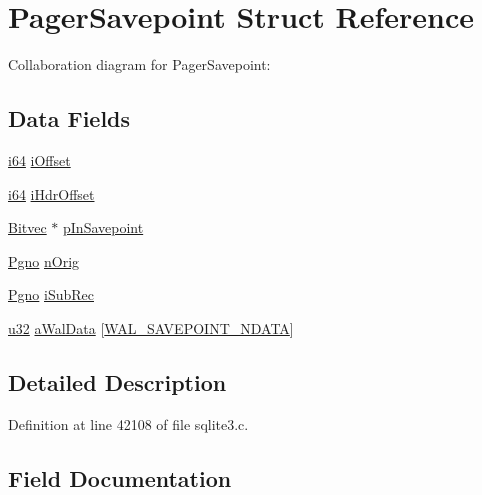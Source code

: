 \hypertarget{struct_pager_savepoint}{}\section{Pager\+Savepoint Struct Reference}
\label{struct_pager_savepoint}


Collaboration diagram for Pager\+Savepoint\+:
\subsection*{Data Fields}
\begin{DoxyCompactItemize}
\item 
\hyperlink{sqlite3_8c_a2a0f0f4ae7001eb54351f77ea1cdbcfd}{i64} \hyperlink{struct_pager_savepoint_a5847134335c04ff468319a20ca90c194}{i\+Offset}
\item 
\hyperlink{sqlite3_8c_a2a0f0f4ae7001eb54351f77ea1cdbcfd}{i64} \hyperlink{struct_pager_savepoint_a1fe600717a168ef1f6a91ec450ac63bb}{i\+Hdr\+Offset}
\item 
\hyperlink{struct_bitvec}{Bitvec} $\ast$ \hyperlink{struct_pager_savepoint_a6480e6f4cc03ee3e484e9ba1a183b330}{p\+In\+Savepoint}
\item 
\hyperlink{sqlite3_8c_aec0c653e8dd16e4639caf2f8ea54f55c}{Pgno} \hyperlink{struct_pager_savepoint_a12bf72a8589b4dea3ac4af0c87eb8e17}{n\+Orig}
\item 
\hyperlink{sqlite3_8c_aec0c653e8dd16e4639caf2f8ea54f55c}{Pgno} \hyperlink{struct_pager_savepoint_acb7e9617ad1b26a76b4d83f2216665d8}{i\+Sub\+Rec}
\item 
\hyperlink{sqlite3_8c_a03ad5adfaeb9b7640dde78a0cc390319}{u32} \hyperlink{struct_pager_savepoint_aa642cbaf7f0a3ab1250d603e7a713516}{a\+Wal\+Data} \mbox{[}\hyperlink{sqlite3_8c_a1406052a1dfd30c3c79af16f3487307e}{W\+A\+L\+\_\+\+S\+A\+V\+E\+P\+O\+I\+N\+T\+\_\+\+N\+D\+A\+T\+A}\mbox{]}
\end{DoxyCompactItemize}


\subsection{Detailed Description}


Definition at line 42108 of file sqlite3.\+c.



\subsection{Field Documentation}
\hypertarget{struct_pager_savepoint_aa642cbaf7f0a3ab1250d603e7a713516}{}
